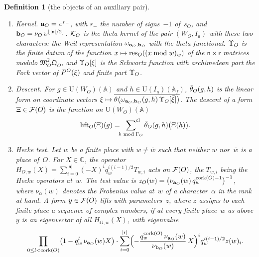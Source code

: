 \documentclass[11pt,a4paper]{article}
\newcommand{\kw}[1]{\emph{#1}}
\newcommand{\m}[1]{\mbox{$#1$}}        %
\theoremstyle{plainx}
\theoremstyle{uprightx}
\newtheorem{definition}[theorem]{Definition}
\newcommand{\CC}{\mathbb{C}}
\newcommand{\AAA}{\mathbb{A}}
\newcommand{\ix}[1]{\mathsf{#1}}
\newcommand{\UU}{\mathrm{U}}
\newcommand{\clsum}[2]{\sideset{}{^{\mathrm{cl}}}\sum_{#1\bmod #2}}
\begin{document}
\begin{definition}[the objects of an auxiliary pair]
\begin{enumerate}[label=\textup{(\arabic*)},leftmargin=2.3em,itemsep=2pt]
positive letters and of the polynomial of the indicator of~$l'$, of weight~$\kappa^{-}_O$, written in the negative
letters: a variable \m{(\tau,i,h)} of the first is replaced by the sum of the variables \m{x_{\tau,i,c}} over the
\m{c\in\ix r} with \m{s_O(c)=+1} and \m{\operatorname{ord}_O(c)=h}, and likewise for the second with
\m{s_O(c)=-1}. The \kw{harmonic polynomial} of a coordinate vector~$\xi$ of weight \m{\auxKappa{O}} is
\m{\harmonicPoly{O}(\xi)}, where \m{\harmonicPoly{O}} is \m{\tensorPoly{O}} composed with the integral Cartan
embedding of the weight \m{\auxKappa{O}} into the tensor product of the weights $\kappa^{+}_O$ and~$\kappa^{-}_O$.
\item \emph{Kernel.} \m{\auxA{O}=\upsilon^{r_-}}, with $r_-$ the number of signs~$-1$ of~$s_O$, and
\m{\auxB{O}=\nu_O\,\upsilon^{\lfloor|\ix n|/2\rfloor}}. \m{\pairThetaKernel{O}} is the theta kernel of the pair
\m{(W_O,I_{\ix n})} with these two characters: the Weil representation \m{\omega_{\auxA{O},\auxB{O}}} with the theta
functional. \m{\auxDatum{O}} is the finite datum of the function
\m{x\mapsto\resDetDatum{O}{(x\bmod w)_w}} of the \m{\ix n\times\ix r} matrices modulo
\m{\mathfrak{M}_O^{2}\mathfrak{Q}_O}, and \m{\fockDatum{O}{\xi}} is the Schwartz function with archimedean part the Fock
vector of \m{\harmonicPoly{O}(\xi)} and finite part \m{\auxDatum{O}}.
\item \emph{Descent.} For \m{g\in\UU(W_O)(\AAA)} and \m{h\in\UU(I_{\ix n})(\AAA_f)}, \m{\conjKernel{O}{g}{h}} is the
linear form on coordinate vectors
\m{\xi\mapsto\overline{\theta\bigl(\omega_{\auxA{O},\auxB{O}}(g,h)\,\fockDatum{O}{\bar\xi}\bigr)}}. The \kw{descent} of a form
\m{\Xi\in\FormV{O}} is the function on \m{\UU(W_O)(\AAA)}
\[\descent{O}{\Xi}{g}=\clsum{h}{\levelGroup{O}}\conjKernel{O}{g}{h}\bigl(\Xi(h)\bigr).\]
\item \emph{Hecke test.} Let $w$ be a finite place with \m{w\ne\bar w} such that neither $w$ nor~$\bar w$ is a place
of~$O$. For \m{X\in\CC}, the operator \m{H_{O,w}(X)=\sum_{i=0}^{|\ix n|}(-X)^i q_w^{i(i-1)/2}T_{w,i}} acts on
\m{\FormV{O}}, the $T_{w,i}$ being the Hecke operators at~$w$. The \kw{test value} is
\m{\testValue{O}{w}=\bigl(\nu_{\auxA{O}}(w)\,q_w^{\rankDiff{O}-1}\bigr)^{-1}}, where \m{\nu_{\alpha}(w)} denotes the
Frobenius value at~$w$ of a character~$\alpha$ in the rank at hand. A form \m{y\in\FormV{O}} \kw{lifts with
parameters~$z$}, where $z$ assigns to each finite place a sequence of complex numbers, if at every finite
place~$w$ as above $y$ is an eigenvector of all \m{H_{O,w}(X)}, with eigenvalue
\[\prod_{0\le l<\rankDiff{O}}\bigl(1-q_w^{l}\,\nu_{\auxA{O}}(w)X\bigr)\cdot\sum_{i=0}^{|\ix r|}\Bigl(-\frac{q_w^{\rankDiff{O}}\,\nu_{\auxA{O}}(w)}{\nu_{\auxB{O}}(w)}\,X\Bigr)^{i}q_w^{i(i-1)/2}z(w)_i .\]
\end{enumerate}
\end{definition}
\end{document}
